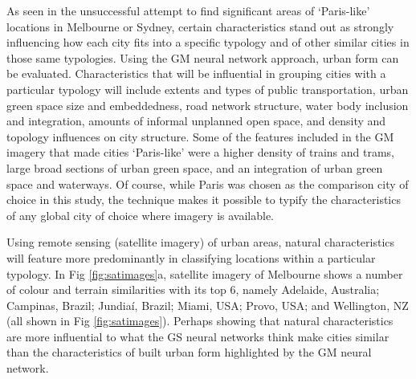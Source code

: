 \documentclass[10pt,letterpaper,hidelinks]{article}
\begin{document}
As seen in the unsuccessful attempt to find significant areas of `Paris-like' locations in Melbourne or Sydney, certain characteristics stand out as strongly influencing how each city fits into a specific typology and of other similar cities in those same typologies. Using the GM neural network approach, urban form can be evaluated. Characteristics that will be influential in grouping cities with a particular typology will include extents and types of public transportation, urban green space size and embeddedness, road network structure, water body inclusion and integration, amounts of informal unplanned open space, and density and topology influences on city structure. Some of the features included in the GM imagery that made cities `Paris-like' were a higher density of trains and trams, large broad sections of urban green space, and an integration of urban green space and waterways. Of course, while Paris was chosen as the comparison city of choice in this study, the technique makes it possible to typify the characteristics of any global city of choice where imagery is available.


Using remote sensing (satellite imagery) of urban areas, natural characteristics will feature more predominantly in classifying locations within a particular typology. In Fig \ref{fig:satimages}a, satellite imagery of Melbourne shows a number of colour and terrain similarities with its top 6, namely Adelaide, Australia; Campinas, Brazil; Jundia\'{i}, Brazil; Miami, USA; Provo, USA; and Wellington, NZ (all shown in Fig \ref{fig:satimages}). Perhaps showing that natural characteristics are more influential to what the GS neural networks think make cities similar than the characteristics of built urban form highlighted by the GM neural network.


\end{document}
